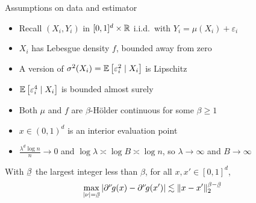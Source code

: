 \documentclass{beamer}
\begin{document}
\begin{frame}{Assumptions on data and estimator}

  \vspace*{2mm}
  \begin{itemize}
    \item Recall $(X_i, Y_i)$ in $[0,1]^d \times \mathbb{R}$
      i.i.d.\ with $Y_i = \mu(X_i) + \varepsilon_i$
    \item $X_i$ has Lebesgue density
      $f$, bounded away from zero
    \item A version of
      $\sigma^2(X_i) = \mathbb{E} \left[ \varepsilon_i^2 \mid X_i \right]$
      is Lipschitz
    \item
      $\mathbb{E} \left[ \varepsilon_i^4 \mid X_i \right]$
      is bounded almost surely
    \item Both $\mu$ and $f$ are
      \alert{$\beta$-H{\"o}lder continuous}
      for some $\beta \geq 1$
    \item $x \in (0,1)^d$
      is an interior evaluation point
    \item
      $\frac{\lambda^d \log n}{n} \to 0$
      and
      $\log \lambda \asymp \log B \asymp \log n$,
      so $\lambda \to \infty$ and $B \to \infty$
  \end{itemize}

  \begin{definition}
    With $\flbeta$ the largest integer
    less than $\beta$, for all $x,x' \in [0,1]^d$,
    \vspace*{-2mm}
    \begin{align*}
      \max_{|\nu| = \flbeta}
      \left|
      \partial^\nu \hspace*{-0.5mm} g(x)
      - \partial^{\nu} \hspace*{-0.5mm} g(x')
      \right|
      &\lesssim \|x-x'\|_2^{\beta - \flbeta}
    \end{align*}
    \vspace*{-4mm}
  \end{definition}

\end{frame}
\end{document}
